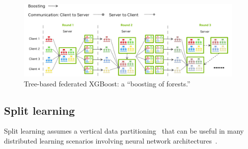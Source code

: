 \documentclass[11pt]{article}
\begin{document}
\begin{figure}[htbp]
    \centering
    \includegraphics[width=0.99\textwidth]{submissions/HolgerRoth/fig/TreeXGBoost.pdf}
    \caption{Tree-based federated XGBoost: a ``boosting of forests.'' \label{fig:tree_xgboost}}
\end{figure}


\subsection{Split learning}
Split learning assumes a vertical data partitioning~\cite{yang2019federated} that can be useful in many distributed learning scenarios involving neural network architectures~\cite{gupta2018distributed}.
\end{document}
